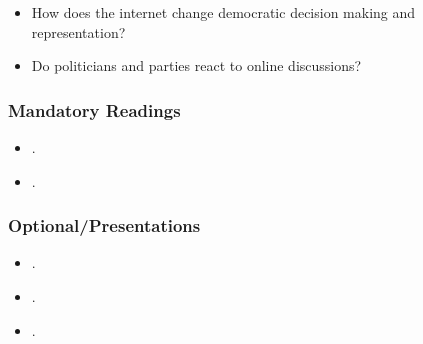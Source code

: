\documentclass[abstract=on,parskip=full,headings=standardclasses,fontsize=11pt,paper=a4]{scrartcl}
\begin{document}
\begin{itemize}
\renewcommand\labelitemi{--}
\item How does the internet change democratic decision making and representation?
\item Do politicians and parties react to online discussions?
\end{itemize}

\subsubsection*{Mandatory Readings}
\begin{itemize}
\item {}.
\item {}.
\end{itemize}


\subsubsection*{Optional/Presentations}
\begin{itemize}
\item {}.
\item {}.
\item {}.
\end{itemize}

\sloppy
\renewcommand*{\bibfont}{\small}

\setlength{\bibitemsep}{0.2em} %

\bigskip

\end{document}
